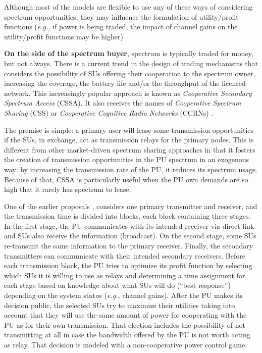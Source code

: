 Although most of the models are flexible to use any of these ways of considering spectrum opportunities, they may influence the formulation of utility/profit functions (\textit{e.g.,} if power is being traded, the impact of channel gains on the utility/profit functions may be higher)

\textbf{On the side of the spectrum buyer}, spectrum is typically traded for money, but not always. There is a current trend in the design of trading mechanisms that considers the possibility of SUs offering their cooperation to the spectrum owner, increasing the coverage, the battery life and/or the throughput of the licensed network. This increasingly popular approach is known as \textit{Cooperative Secondary Spectrum Access} (CSSA). It also receives the names of \textit{Cooperative Spectrum Sharing} (CSS) or \textit{Cooperative Cognitive Radio Networks} (CCRNs) \cite{ref:Simeone2008,ref:Zhang2009,ref:Yi2010,ref:Vazquez2010,ref:Li2011,ref:Duan2011_Contract,ref:Duan2014,ref:Yan2013,ref:Feng2014,ref:Canzian2013}.

The premise is simple: a primary user will lease some transmission opportunities if the SUs, in exchange, act as transmission relays for the primary nodes. This is different from other market-driven spectrum sharing approaches in that it fosters the creation of transmission opportunities in the PU spectrum in an exogenous way: by increasing the transmission rate of the PU, it reduces its spectrum usage. Because of that, CSSA is particularly useful when the PU own demands are so high that it rarely has spectrum to lease.

One of the earlier proposals \cite{ref:Simeone2008}, considers one primary transmitter and receiver, and the transmission time is divided into blocks, each block containing three stages. In the first stage, the PU communicates with its intended receiver via direct link and SUs also receive the information (broadcast). On the second stage, some SUs re-transmit the same information to the primary receiver. Finally, the secondary transmitters can communicate with their intended secondary receivers. Before each transmission block, the PU tries to optimize its profit function by selecting which SUs it is willing to use as relays and determining a time assignment for each stage based on knowledge about what SUs will do (``best response'') depending on the system status (\textit{e.g.,} channel gains). After the PU makes its decision public, the selected SUs try to maximize their utilities taking into account that they will use the same amount of power for cooperating with the PU as for their own transmission. That election includes the possibility of not transmitting at all in case the bandwidth offered by the PU is not worth acting as relay. That decision is modeled with a non-cooperative power control game.

